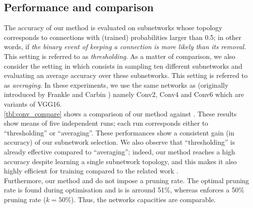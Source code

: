     

\subsection{Performance and comparison}


 


The accuracy of our method is evaluated on subnetworks whose topology
corresponds to connections with  (trained) probabilities larger than 0.5;  in
other words,  if {\it the binary event of keeping a connection is more likely
than its removal}.  This setting is referred to as  {\it thresholding}.  As a
matter of comparison,  we also consider the setting in
\cite{DBLP:conf/nips/ZhouLLY19} which consists in sampling ten different
subnetworks and evaluating an average accuracy over  these subnetworks.  This
setting  is referred to as {\it averaging}.  In these experiments,  we use the
same networks as
\cite{DBLP:conf/nips/ZhouLLY19,DBLP:conf/cvpr/RamanujanWKFR20} (originally
introduced by  Frankle and Carbin \cite{DBLP:conf/iclr/FrankleC19}) namely
Conv2,  Conv4 and Conv6 which are  variants of  VGG16. \\
\indent   \cref{tbl:conv_compare}  shows a comparison of our method against
\cite{DBLP:conf/nips/ZhouLLY19,DBLP:conf/cvpr/RamanujanWKFR20}.    These
results show means of five independent runs; each run corresponds either to
``thresholding'' or ``averaging''.  These performances show a consistent gain
(in accuracy) of our subnetwork selection.   We also observe that
``thresholding'' is already effective compared to ``averaging''; indeed, our
method reaches a  high accuracy despite learning a single subnetwork topology,
and this makes it also highly efficient for training compared to  the related
work \cite{DBLP:conf/nips/ZhouLLY19,DBLP:conf/cvpr/RamanujanWKFR20}.\\ 
\indent Furthermore, our method and \cite{DBLP:conf/nips/ZhouLLY19} do not
impose a pruning rate. The optimal pruning rate is found during optimisation and
is is arround 51\%, whereas \cite{DBLP:conf/cvpr/RamanujanWKFR20} enforces a 50\%
pruning rate ($k=50\%$). Thus, the networks capacities
are comparable. \\


